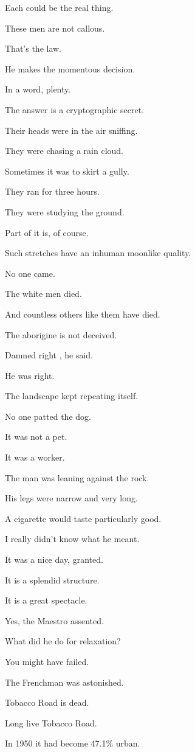 \documentclass[11pt]{article}
\begin{document}
Each could be the real thing. 

These men are not callous. 

That's the law. 

He makes the momentous decision. 

In a word, plenty.

The answer is a cryptographic secret. 

Their heads were in the air sniffing. 

They were chasing a rain cloud. 

Sometimes it was to skirt a gully. 

They ran for three hours. 

They were studying the ground. 

Part of it is, of course. 

Such stretches have an inhuman moonlike quality. 

No one came. 

The white men died. 

And countless others like them have died. 

The aborigine is not deceived.


Damned right , he said. 

He was right. 

The landscape kept repeating itself. 

No one patted the dog. 

It was not a pet. 

It was a worker. 

The man was leaning against the rock. 

His legs were narrow and very long. 

A cigarette would taste particularly good. 

I really didn't know what he meant. 

It was a nice day, granted. 

It is a splendid structure. 

It is a great spectacle. 

Yes, the Maestro assented. 

What did he do for relaxation?

You might have failed. 

The Frenchman was astonished. 

Tobacco Road is dead. 

Long live Tobacco Road. 

In 1950 it had become 47.1\% urban. 
\end{document}

